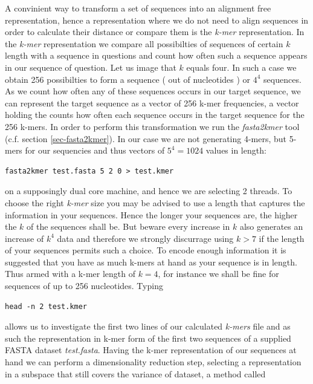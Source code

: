 A convinient way to transform a set of sequences into an alignment
free representation, hence a representation where we do not need to
align sequences in order to calculate their distance or compare them
is the \emph{k-mer} representation. In the \emph{k-mer}
representation we compare all possibilties of sequences of certain $k$
length with a sequence in questions and count how often such a
sequence appears in our sequence of question. Let us image that $k$ equals
four. In such a case we obtain 256 possibilties to form a sequence ( out of
nucleotides ) or $4^4$ sequences. As we count how often any of these
sequences occurs in our target sequence, we can represent the target
sequence as a vector of 256 k-mer frequencies, a vector holding the
counts how often each sequence occurs in the target sequence for the
256 k-mers.
In order to perform this transformation we run the
\emph{fasta2kmer} tool (c.f. section \ref{sec-fasta2kmer}). In our case
we are not generating 4-mers, but 5-mers for our sequencies and thus
vectors of $5^{4}=1024$ values in length:
\begin{lstlisting}
fasta2kmer test.fasta 5 2 0 > test.kmer
\end{lstlisting}
on a supposingly dual core machine, and hence we are selecting 2 threads. To
choose the right \emph{k-mer} size you may be advised to use a length
that captures the information in your sequences. Hence the longer your
sequences are, the higher the $k$ of the sequences shall be. But
beware every increase in $k$ also generates an increase of $k^4$
data and therefore we strongly discurrage using $k > 7$ if the length of
your sequences permits such a choice.
To encode enough information it is suggested
that you have as much k-mers at hand as your sequence is in
length. Thus armed with a k-mer length of $k=4$, for instance we shall
be fine for sequences of up to 256 nucleotides.
Typing
\begin{lstlisting}
head -n 2 test.kmer
\end{lstlisting}
allows us to investigate the first two lines of our calculated \emph{k-mers}
file and as such the representation in k-mer form of the first two
sequences of a supplied FASTA dataset \emph{test.fasta}.
Having the k-mer representation of our sequences at hand we
can perform a dimensionality reduction step, selecting a representation in
a subspace that still covers the variance of dataset, a method called
